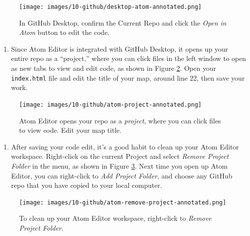 \documentclass[
  english,
]{book}
\providecommand{\tightlist}{%
  \setlength{\itemsep}{0pt}\setlength{\parskip}{0pt}}
\begin{document}
\begin{figure}
\centering
\texttt{[image: images/10-github/desktop-atom-annotated.png]}
\caption{\label{fig:desktop-atom}In GitHub Desktop, confirm the Current Repo and click the \emph{Open in Atom} button to edit the code.}
\end{figure}

\begin{enumerate}
\def\labelenumi{\arabic{enumi}.}
\setcounter{enumi}{8}
\tightlist
\item
  Since Atom Editor is integrated with GitHub Desktop, it opens up your entire repo as a ``project,'' where you can click files in the left window to open as new tabs to view and edit code, as shown in Figure \ref{fig:atom-project}. Open your \texttt{index.html} file and edit the title of your map, around line 22, then save your work.
\end{enumerate}



\begin{figure}
\centering
\texttt{[image: images/10-github/atom-project-annotated.png]}
\caption{\label{fig:atom-project}Atom Editor opens your repo as a \emph{project}, where you can click files to view code. Edit your map title.}
\end{figure}

\begin{enumerate}
\def\labelenumi{\arabic{enumi}.}
\setcounter{enumi}{9}
\tightlist
\item
  After saving your code edit, it's a good habit to clean up your Atom Editor workspace. Right-click on the current Project and select \emph{Remove Project Folder} in the menu, as shown in Figure \ref{fig:atom-remove-project}. Next time you open up Atom Editor, you can right-click to \emph{Add Project Folder}, and choose any GitHub repo that you have copied to your local computer.
\end{enumerate}



\begin{figure}
\centering
\texttt{[image: images/10-github/atom-remove-project-annotated.png]}
\caption{\label{fig:atom-remove-project}To clean up your Atom Editor workspace, right-click to \emph{Remove Project Folder}.}
\end{figure}
\end{document}
